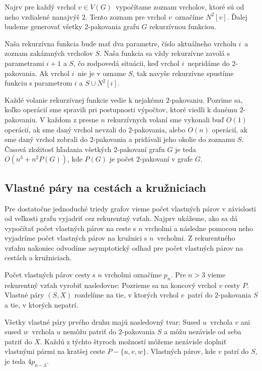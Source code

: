 Najrv pre každý vrchol $v \in V(G)$ vypočítame zoznam vrcholov, ktoré sú od neho vzdialené
nanajvýš $2$. Tento zoznam pre vrchol $v$ označíme $N^2[v]$.
Ďalej budeme generovať všetky $2$-pakovania grafu $G$ rekurzívnou funkciou.

Naša rekurzívna funkcia bude mať dva parametre, číslo aktuálneho vrcholu $i$ a zoznam zakázaných
vrcholov $S$. Naša funkcia sa vždy rekurzívne zavolá s parametrami $i+1$ a $S$, čo zodpovedá
situácii, keď vrchol $i$ nepridáme do $2$-pakovania. Ak vrchol $i$ nie je v ozname $S$, tak
navyše rekurzívne spustíme funkciu s parametrom $i$ a $S \cup N^2[i]$.

Každé volanie rekurzívnej funkcie vedie k nejakému $2$-pakovaniu. Pozrime sa, koľko operácií sme
spravili pri postupnosti výpočtov, ktoré viedli k danému $2$-pakovaniu. V každom z presne $n$
rekurzívnych volaní sme vykonali buď $O(1)$ operácií, ak sme daný vrchol nevzali do $2$-pakovania,
alebo $O(n)$ operácií, ak sme daný vrchol zobrali do $2$-pakovania a pridávali jeho okolie do
zoznamu $S$. Časová zložitosť hľadania všetkých $2$-pakovaní grafu $G$ je teda $O(n^3 + n^2P(G))$,
kde $P(G)$ je počet $2$-pakovaní v grafe $G$.

\subsection{Vlastné páry na cestách a kružniciach}

Pre dostatočne jednoduché triedy grafov vieme počet vlastných párov v závislosti
od veľkosti grafu vyjadriť cez rekurentný vzťah. Najprv ukážeme, ako sa dá vypočítať počet
vlastných párov na ceste s $n$ vrcholmi a následne pomocou neho vyjadríme počet vlastných
párov na kružnici s $n$ vrcholmi. Z rekurentného vzťahu nakoniec odvodíme asymptotický odhad
pre počet vlastných párov na cestách a kružniciach.

Počet vlastných párov cesty s $n$ vrcholmi označíme $p_n$. Pre $n > 3$ vieme rekurentný
vzťah vyrobiť nasledovne: Pozrieme sa na koncový vrchol $v$ cesty $P$. Vlastné páry $(S,X)$ rozdelíme
na tie, v ktorých vrchol $v$ patrí do $2$-pakovania $S$ a tie, v ktorých nepatrí.

Všetky vlastné páry
prvého druhu majú nasledovný tvar: Sused $u$ vrchola $v$ ani sused $w$ vrchola $u$ nemôžu
patriť do $2$-pakovania $S$ a môžu nezávisle od seba patriť do $X$. Každú z týchto štyroch
možností môžeme nezávisle doplniť vlastnými pármi na kratšej ceste $P - \{u, v, w\}$.
Vlastných párov, kde $v$ patrí do $S$, je teda $4p_{n-3}$.


